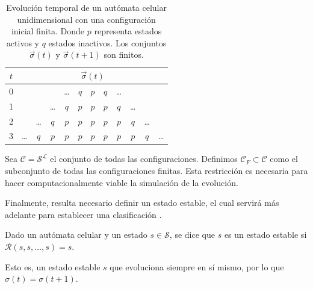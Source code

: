 \begin{table}
	
	\centering
	
	\begin{tabular}{c | c c c c c c c c c c c} 
		
		$t$ & \multicolumn{11}{c}{ $\vec{\sigma}(t)$  } \\ \hline \hline
		
		0 & && & \dots & $q$ & $p$ & $q$ & \dots & && \\ \hline
		
		1 & & & \dots & $q$ & $p$ & $p$&  $p$ & $q$ & \dots & & \\ \hline
		
		2  & & \dots & $q$  & $p$ & $p$ & $p$&  $p$ &  $p$& $q$ & \dots &  \\ \hline
		
		3 & \dots & $q$  & $p$ & $p$ & $p$&  $p$&$p$ &$p$& $p$ & $q$ & \dots \\
		
	\end{tabular}
	
	\caption{Evolución temporal de un autómata celular unidimensional con una configuración inicial finita. Donde $p$ representa estados activos y $q$ estados inactivos. Los conjuntos $\vec{\sigma} (t)$ y $\vec{\sigma} (t + 1)$ son finitos.}
	
	\label{tab:CA_finito}
	
\end{table}

Sea $\mathcal{C} =  \mathcal{S}^\mathcal{L}$ el conjunto de todas las configuraciones. Definimos $\mathcal{C}_F \subset \mathcal{C}$ como el subconjunto de todas las configuraciones finitas. Esta restricción es necesaria para hacer computacionalmente viable la simulación de la evolución.

Finalmente, resulta necesario definir un estado estable, el cual servirá más adelante para establecer una clasificación \cite{ca_phd}. 

\begin{definition}
	
	Dado un autómata celular y un estado $s \in \mathcal{S}$, se dice que $s$ es un estado estable si $\mathcal{R}(s, s, \dots, s) = s$.
	
\end{definition}

Esto es, un estado estable $s$ que evoluciona siempre en sí mismo, por lo que $\sigma(t) = \sigma(t + 1)$. 


